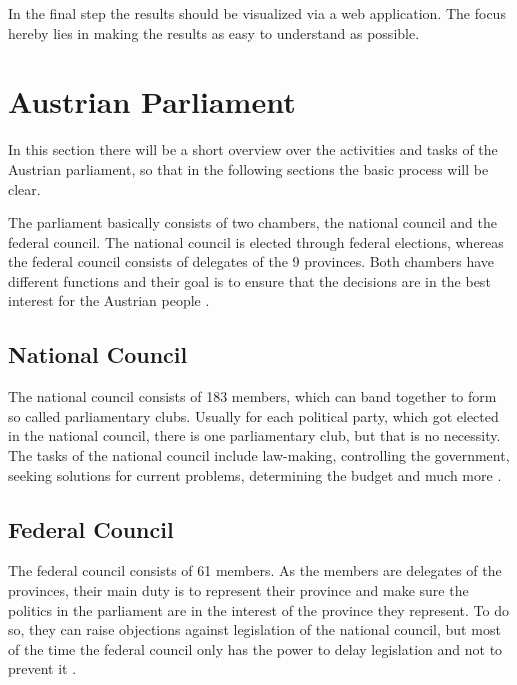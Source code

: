 In the final step the results should be visualized via a web application. The focus hereby lies in making the results as easy to understand as possible.

\section{Austrian Parliament}
In this section there will be a short overview over the activities and tasks of the Austrian parliament, so that in the following sections the basic process will be clear.

The parliament basically consists of two chambers, the national council and the federal council. The national council is elected through federal elections, whereas the federal council consists of delegates of the 9 provinces. Both chambers have different functions and their goal is to ensure that the decisions are in the best interest for the Austrian people \cite{AustrianParliament_2015}.

\subsection{National Council}
The national council consists of 183 members, which can band together to form so called parliamentary clubs. Usually for each political party, which got elected in the national council, there is one parliamentary club, but that is no necessity. The tasks of the national council include law-making, controlling the government, seeking solutions for current problems, determining the budget and much more \cite{AustrianParliament_2015}. 

\subsection{Federal Council}
The federal council consists of 61 members. As the members are delegates of the provinces, their main duty is to represent their province and make sure the politics in the parliament are in the interest of the province they represent. To do so, they can raise objections against legislation of the national council, but most of the time the federal council only has the power to delay legislation and not to prevent it \cite{AustrianParliament_2015}.
